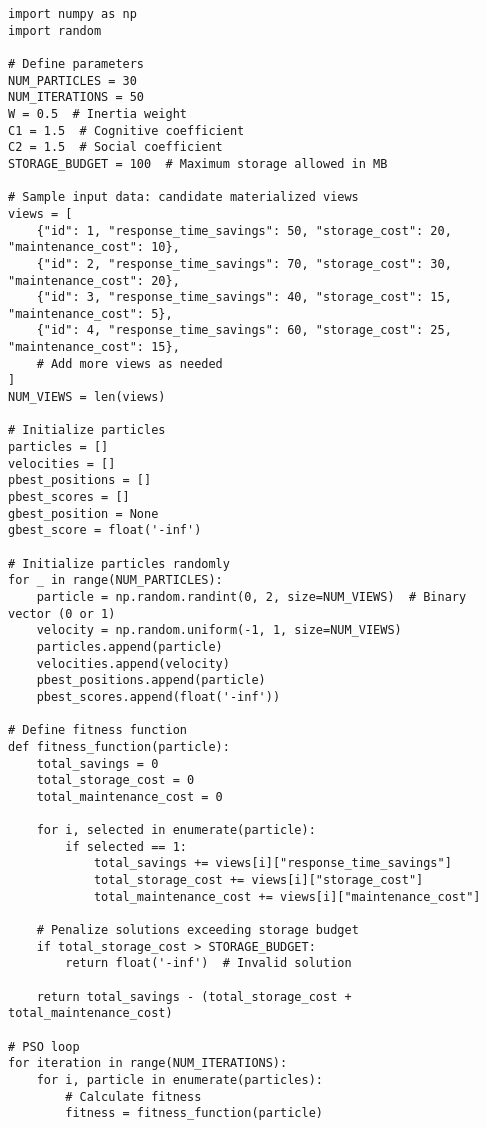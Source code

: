 \begin{verbatim}
import numpy as np
import random

# Define parameters
NUM_PARTICLES = 30
NUM_ITERATIONS = 50
W = 0.5  # Inertia weight
C1 = 1.5  # Cognitive coefficient
C2 = 1.5  # Social coefficient
STORAGE_BUDGET = 100  # Maximum storage allowed in MB

# Sample input data: candidate materialized views
views = [
    {"id": 1, "response_time_savings": 50, "storage_cost": 20, "maintenance_cost": 10},
    {"id": 2, "response_time_savings": 70, "storage_cost": 30, "maintenance_cost": 20},
    {"id": 3, "response_time_savings": 40, "storage_cost": 15, "maintenance_cost": 5},
    {"id": 4, "response_time_savings": 60, "storage_cost": 25, "maintenance_cost": 15},
    # Add more views as needed
]
NUM_VIEWS = len(views)

# Initialize particles
particles = []
velocities = []
pbest_positions = []
pbest_scores = []
gbest_position = None
gbest_score = float('-inf')

# Initialize particles randomly
for _ in range(NUM_PARTICLES):
    particle = np.random.randint(0, 2, size=NUM_VIEWS)  # Binary vector (0 or 1)
    velocity = np.random.uniform(-1, 1, size=NUM_VIEWS)
    particles.append(particle)
    velocities.append(velocity)
    pbest_positions.append(particle)
    pbest_scores.append(float('-inf'))

# Define fitness function
def fitness_function(particle):
    total_savings = 0
    total_storage_cost = 0
    total_maintenance_cost = 0

    for i, selected in enumerate(particle):
        if selected == 1:
            total_savings += views[i]["response_time_savings"]
            total_storage_cost += views[i]["storage_cost"]
            total_maintenance_cost += views[i]["maintenance_cost"]

    # Penalize solutions exceeding storage budget
    if total_storage_cost > STORAGE_BUDGET:
        return float('-inf')  # Invalid solution

    return total_savings - (total_storage_cost + total_maintenance_cost)

# PSO loop
for iteration in range(NUM_ITERATIONS):
    for i, particle in enumerate(particles):
        # Calculate fitness
        fitness = fitness_function(particle)


\end{verbatim}
